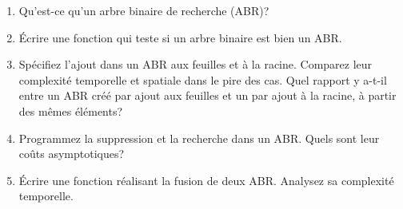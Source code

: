   \begin{enumerate}
    \item Qu'est-ce qu'un arbre binaire de recherche (ABR)?

    \item Écrire une fonction qui teste si un arbre binaire est bien
          un ABR.

    \item Spécifiez l'ajout dans un ABR aux feuilles et à la
          racine. Comparez leur complexité temporelle et spatiale dans
          le pire des cas. Quel rapport y a-t-il entre un ABR
          créé par ajout aux feuilles et un par ajout à la racine, à
          partir des mêmes éléments?

    \item Programmez la suppression et la recherche dans un ABR. Quels
          sont leur coûts asymptotiques?

    \item Écrire une fonction réalisant la fusion de deux
          ABR. Analysez sa complexité temporelle.

  \end{enumerate}
